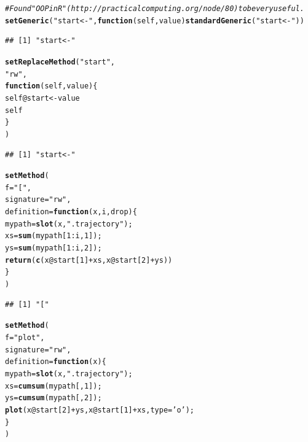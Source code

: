 \documentclass{article}\usepackage[]{graphicx}\usepackage[]{color}
\makeatletter
\newcommand{\hlnum}[1]{\textcolor[rgb]{0.686,0.059,0.569}{#1}}%
\newcommand{\hlstr}[1]{\textcolor[rgb]{0.192,0.494,0.8}{#1}}%
\newcommand{\hlcom}[1]{\textcolor[rgb]{0.678,0.584,0.686}{\textit{#1}}}%
\newcommand{\hlopt}[1]{\textcolor[rgb]{0,0,0}{#1}}%
\newcommand{\hlstd}[1]{\textcolor[rgb]{0.345,0.345,0.345}{#1}}%
\newcommand{\hlkwa}[1]{\textcolor[rgb]{0.161,0.373,0.58}{\textbf{#1}}}%
\newcommand{\hlkwb}[1]{\textcolor[rgb]{0.69,0.353,0.396}{#1}}%
\newcommand{\hlkwc}[1]{\textcolor[rgb]{0.333,0.667,0.333}{#1}}%
\newcommand{\hlkwd}[1]{\textcolor[rgb]{0.737,0.353,0.396}{\textbf{#1}}}%
\newenvironment{kframe}{%
 \def\at@end@of@kframe{}%
 \ifinner\ifhmode%
  \def\at@end@of@kframe{\end{minipage}}%
  \begin{minipage}{\columnwidth}%
 \fi\fi%
 \def\FrameCommand##1{\hskip\@totalleftmargin \hskip-\fboxsep
 \colorbox{shadecolor}{##1}\hskip-\fboxsep
     \hskip-\linewidth \hskip-\@totalleftmargin \hskip\columnwidth}%
 \MakeFramed {\advance\hsize-\width
   \@totalleftmargin\z@ \linewidth\hsize
   \@setminipage}}%
 {\par\unskip\endMakeFramed%
 \at@end@of@kframe}
\newenvironment{knitrout}{}{} %
\makeatother
\begin{document}
\begin{knitrout}
\begin{kframe}
\begin{alltt}
\hlcom{# Found "OOP in R" (http://practicalcomputing.org/node/80) to be very useful.}
\hlkwd{setGeneric}\hlstd{(}\hlstr{"start<-"}\hlstd{,} \hlkwa{function}\hlstd{(}\hlkwc{self}\hlstd{,} \hlkwc{value}\hlstd{)} \hlkwd{standardGeneric}\hlstd{(}\hlstr{"start<-"}\hlstd{))}
\end{alltt}
\begin{verbatim}
## [1] "start<-"
\end{verbatim}
\begin{alltt}
\hlkwd{setReplaceMethod}\hlstd{(}\hlstr{"start"}\hlstd{,}
  \hlstr{"rw"}\hlstd{,}
  \hlkwa{function}\hlstd{(}\hlkwc{self}\hlstd{,}\hlkwc{value}\hlstd{) \{}
  \hlstd{self}\hlopt{@}\hlkwc{start} \hlkwb{<-} \hlstd{value}
  \hlstd{self}
  \hlstd{\}}
\hlstd{)}
\end{alltt}
\begin{verbatim}
## [1] "start<-"
\end{verbatim}
\begin{alltt}
\hlkwd{setMethod}\hlstd{(}
  \hlkwc{f}\hlstd{=}\hlstr{"["}\hlstd{,}
  \hlkwc{signature}\hlstd{=}\hlstr{"rw"}\hlstd{,}
  \hlkwc{definition}\hlstd{=}\hlkwa{function}\hlstd{(}\hlkwc{x}\hlstd{,}\hlkwc{i}\hlstd{,}\hlkwc{drop}\hlstd{)\{}
    \hlstd{mypath}\hlkwb{=}\hlkwd{slot}\hlstd{(x,}\hlstr{".trajectory"}\hlstd{);}
    \hlstd{xs}\hlkwb{=}\hlkwd{sum}\hlstd{(mypath[}\hlnum{1}\hlopt{:}\hlstd{i,}\hlnum{1}\hlstd{]);}
    \hlstd{ys}\hlkwb{=}\hlkwd{sum}\hlstd{(mypath[}\hlnum{1}\hlopt{:}\hlstd{i,}\hlnum{2}\hlstd{]);}
    \hlkwd{return}\hlstd{(}\hlkwd{c}\hlstd{(x}\hlopt{@}\hlkwc{start}\hlstd{[}\hlnum{1}\hlstd{]}\hlopt{+}\hlstd{xs, x}\hlopt{@}\hlkwc{start}\hlstd{[}\hlnum{2}\hlstd{]}\hlopt{+}\hlstd{ys))}
  \hlstd{\}}
\hlstd{)}
\end{alltt}
\begin{verbatim}
## [1] "["
\end{verbatim}
\begin{alltt}
\hlkwd{setMethod}\hlstd{(}
  \hlkwc{f}\hlstd{=}\hlstr{"plot"}\hlstd{,}
  \hlkwc{signature}\hlstd{=}\hlstr{"rw"}\hlstd{,}
  \hlkwc{definition}\hlstd{=}\hlkwa{function}\hlstd{(}\hlkwc{x}\hlstd{)\{}
    \hlstd{mypath}\hlkwb{=}\hlkwd{slot}\hlstd{(x,}\hlstr{".trajectory"}\hlstd{);}
    \hlstd{xs}\hlkwb{=}\hlkwd{cumsum}\hlstd{(mypath[,}\hlnum{1}\hlstd{]);}
    \hlstd{ys}\hlkwb{=}\hlkwd{cumsum}\hlstd{(mypath[,}\hlnum{2}\hlstd{]);}
    \hlkwd{plot}\hlstd{(x}\hlopt{@}\hlkwc{start}\hlstd{[}\hlnum{2}\hlstd{]}\hlopt{+}\hlstd{ys,x}\hlopt{@}\hlkwc{start}\hlstd{[}\hlnum{1}\hlstd{]}\hlopt{+}\hlstd{xs,} \hlkwc{type}\hlstd{=}\hlstr{'o'}\hlstd{);}
  \hlstd{\}}
\hlstd{)}
\end{alltt}



\end{kframe}
\end{knitrout}
\end{document}
